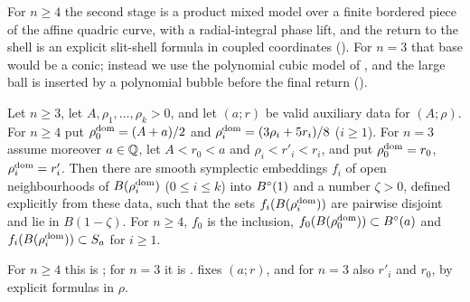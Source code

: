 For $n\ge4$ the second stage is a product mixed model over a finite bordered piece of the affine quadric curve,
with a radial-integral phase lift, and the return to the shell is an explicit slit-shell formula in coupled
coordinates (). For $n=3$ that base would be a conic; instead we use the polynomial cubic
model of \cite{OpenAI2026}, and the large ball is inserted by a polynomial bubble before the final return
().

\begin{theorem}\label{thm:mdl-lrg}
Let $n\ge3$, let $A,\rho_1,\dots,\rho_k>0$, and let $(a;r)$ be valid auxiliary data for $(A;\rho)$. For $n\ge4$ put
$\rho_0^{\rm dom}=(A+a)/2$ and $\rho_i^{\rm dom}=(3\rho_i+5r_i)/8$ ($i\ge1$). For $n=3$ assume moreover $a\in\mathbb{Q}$, let
$A<r_0<a$ and $\rho_i<r'_i<r_i$, and put $\rho_0^{\rm dom}=r_0$, $\rho_i^{\rm dom}=r'_i$. Then there are smooth symplectic
embeddings $f_i$ of open neighbourhoods of $B(\rho_i^{\rm dom})$ ($0\le i\le k$) into $B^{\circ}(1)$ and a number $\zeta>0$,
defined explicitly from these data, such that the sets $f_i(B(\rho_i^{\rm dom}))$ are pairwise disjoint and lie in
$B(1-\zeta)$. For $n\ge4$, $f_0$ is the inclusion, $f_0(B(\rho_0^{\rm dom}))\subset B^{\circ}(a)$ and
$f_i(B(\rho_i^{\rm dom}))\subset S_a$ for $i\ge1$.
\end{theorem}

For $n\ge4$ this is ; for $n=3$ it is .
 fixes $(a;r)$, and for $n=3$ also $r'_i$ and $r_0$, by explicit formulas in $\rho$.
